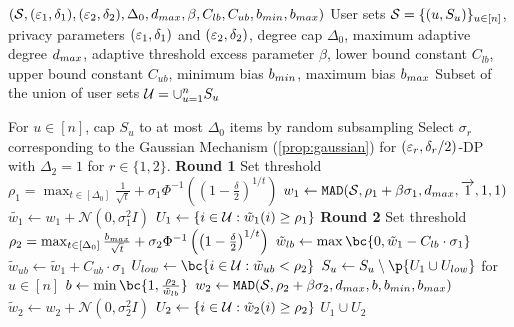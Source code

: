\begin{algorithm}[ht]
\caption{\ouralgotworounds{}$(\mathcal{S}, (\varepsilon_1, \delta_1), (\varepsilon_2, \delta_2), \Delta_0, d_{max}, \beta, C_{lb}, C_{ub}, b_{min}, b_{max})$
  User sets $\mathcal{S}=\{(u, S_u)\}_{u\in [n]}$,
 privacy parameters $(\varepsilon_1, \delta_1)$ and $(\varepsilon_2, \delta_2)$,
 degree cap $\Delta_0$,
 maximum adaptive degree $d_{max}$,
 adaptive threshold excess parameter $\beta$,
 lower bound constant $C_{lb}$,
 upper bound constant $C_{ub}$,
 minimum bias $b_{min}$,
 maximum bias $b_{max}$
  Subset of the union of user sets $\mathcal{U} = \cup_{u=1}^n S_u$
}
\begin{algorithmic}[1]
\label{alg:max-deg-two-round}
\STATE For $u \in [n]$, cap $S_u$ to at most $\Delta_0$ items by random subsampling
\STATE Select $\sigma_r$ corresponding to the Gaussian Mechanism (\cref{prop:gaussian}) for $(\varepsilon_r, \delta_r/2)$-DP with $\Delta_2 = 1$ for $r \in \{1,2\}$.
\STATE \textbf{Round 1}
\STATE Set threshold $\rho_1 = \max_{t \in [\Delta_0]} \frac{1}{\sqrt{t}} + \sigma_1 \Phi^{-1}\left(\left(1 - \frac{\delta}{2}\right)^{1/t}\right)$
\STATE $w_1 \gets \texttt{MAD}(\mathcal{S}, \rho_1 + \beta \sigma_1, d_{max}, \overrightarrow{1}, 1, 1)$ 
\STATE $\tilde{w_1} \gets w_1 + \mathcal{N}(0, \sigma_1^2 I)$ 
\STATE $U_1 \gets \{i \in \mathcal{U} : \tilde{w}_1(i) \geq \rho_1\}$ 
\STATE \textbf{Round 2}
\STATE Set threshold $\rho_2 = \max_{t \in [\Delta_0]} \frac{b_{max}}{\sqrt{t}} + \sigma_2 \Phi^{-1}\left(\left(1 - \frac{\delta}{2}\right)^{1/t}\right)$
\STATE $\tilde{w}_{lb} \gets \max\bc{0, \tilde{w}_1 - C_{lb} \cdot \sigma_1}$
\STATE $\tilde{w}_{ub} \gets \tilde{w}_1 + C_{ub} \cdot \sigma_1$
\STATE $U_{low} \gets \bc{i \in \U: \tilde{w}_{ub} < \rho_2}$
\STATE $S_u \gets S_u \setminus \p{U_1 \cup U_{low}}$ for $u \in [n]$
\STATE $b \gets \min\bc{1, \frac{\rho_2}{\tilde{w}_{lb}}}$
\STATE $w_2 \gets \texttt{MAD}{}(\mathcal{S}, \rho_2 + \beta \sigma_2, d_{max}, b, b_{min}, b_{max})$
\STATE $\tilde{w}_2 \gets w_2 + \mathcal{N}(0, \sigma_2^2 I)$ 
\STATE $U_2 \gets \{i \in \mathcal{U} : \tilde{w}_2(i) \geq \rho_2\}$ 
\RETURN $U_1 \cup U_2$
\end{algorithmic}
\end{algorithm}

